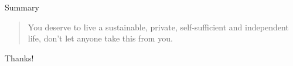 \documentclass[aspectratio=169,usenames,dvipsnames,pdftex]{beamer}
\begin{document}
	\begin{frame}{Summary}
    \begin{quote}
      You deserve to live a sustainable, private, self-sufficient and independent life, don't let anyone take this from you.
    \end{quote}
	\end{frame}

	\begin{frame}[standout]
		Thanks!
	\end{frame}


\end{document}
